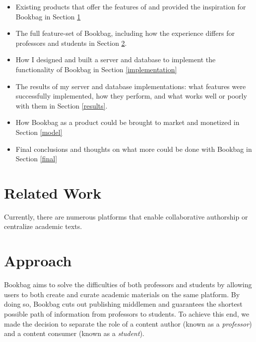\documentclass[pageno]{jpaper}
\begin{document}
\begin{itemize}
    \item Existing products that offer the features of and provided the inspiration for Bookbag in Section \ref{relwork}
    \item The full feature-set of Bookbag, including how the experience differs for professors and students in Section \ref{approach}.
    \item How I designed and built a server and database to implement the functionality of Bookbag in Section \ref{implementation}
    \item The results of my server and database implementations: what features were successfully implemented, how they perform, and what works well or poorly with them in Section \ref{results}.
    \item How Bookbag as a product could be brought to market and monetized in Section \ref{model}
    \item Final conclusions and thoughts on what more could be done with Bookbag in Section \ref{final}
\end{itemize}

\section{Related Work} \label{relwork}

Currently, there are numerous platforms that enable collaborative authorship or centralize academic texts. 

\section{Approach} \label{approach}

Bookbag aims to solve the difficulties of both professors and students by allowing users to both create and curate academic materials on the same platform. By doing so, Bookbag cuts out publishing middlemen and guarantees the shortest possible path of information from professors to students. To achieve this end, we made the decision to separate the role of a content author (known as a \textit{professor}) and a content consumer (known as a \textit{student}).
\end{document}
